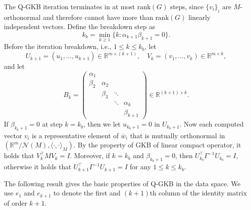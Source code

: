 \documentclass[]{myarticle}
\begin{document}
The Q-GKB iteration terminates in at most $\mathrm{rank}(G)$ steps, since $\{v_i\}_i$ are $M$-orthonormal and therefore cannot have more than $\mathrm{rank}(G)$ linearly independent vectors. Define the breakdown step as
\begin{equation}\label{break}
  k_b = \min_{k\ge 1}\{k: \alpha_{k+1}\beta_{k+1}=0\}.
\end{equation}
Before the iteration breakdown, i.e., $1\leq k\leq k_b$, let
\begin{equation}\label{orth_mat}
  U_{k+1} = (u_1,\dots,u_{k+1}) \in \mathbb R^{m\times (k+1)}, \quad
  V_k = (v_1,\dots,v_k) \in \mathbb R^{m\times k},
\end{equation}
and let
\begin{equation}\label{eq:bidiag-matrix}
B_k =
\begin{pmatrix}
\alpha_1 \\
\beta_2 & \alpha_2 \\
& \beta_3 & \ddots \\
&& \ddots & \alpha_k \\
&&& \beta_{k+1}
\end{pmatrix}
\in \mathbb R^{(k+1)\times k}.
\end{equation}
If $\beta_{k_b+1}=0$ at step $k=k_b$, then we let $u_{k_b+1}=0$ in $U_{k_b+1}$. Now each computed vector $v_i$ is a representative element of $\bar{w}_i$ that is mutually orthonormal in $(\mathbb R^m/\mathcal N(M),\langle\cdot,\cdot\rangle_M)$. By the property of GKB of linear compact operator, it holds that $V_k^\top M V_k = I$. Moreover, if $k=k_b$ and $\beta_{k_b+1}=0$, then $U_{k_b}^\top \Gamma^{-1}U_{k_b}=I$, otherwise it holds that $U_{k+1}^\top \Gamma^{-1}U_{k+1}=I$ for any $1\le k \le k_b$.

The following result gives the basic properties of Q-GKB in the data space. We use $e_1$ and $e_{k+1}$ to denote the first and $(k+1)$th column of the identity matrix of order $k+1$.
\end{document}
